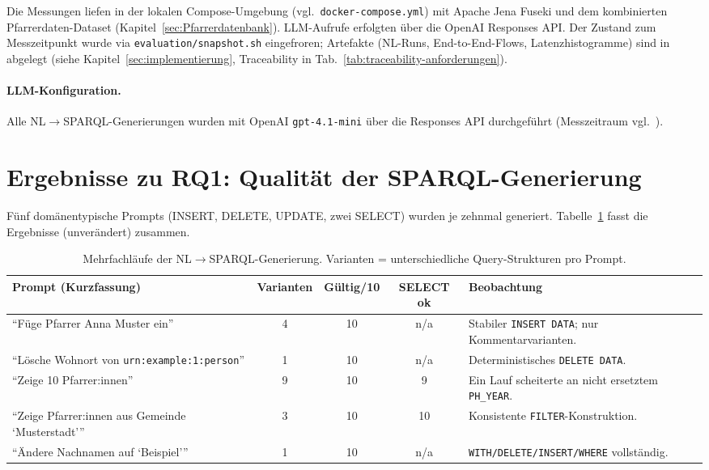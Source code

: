 Die Messungen liefen in der lokalen Compose-Umgebung (vgl.\ \texttt{docker-compose.yml}) mit Apache Jena Fuseki und dem kombinierten Pfarrerdaten-Dataset (Kapitel~\ref{sec:Pfarrerdatenbank}). LLM-Aufrufe erfolgten über die OpenAI Responses API. Der Zustand zum Messzeitpunkt wurde via \texttt{evaluation/snapshot.sh} eingefroren; Artefakte (NL-Runs, End-to-End-Flows, Latenzhistogramme) sind in  abgelegt (siehe Kapitel~\ref{sec:implementierung}, Traceability in Tab.~\ref{tab:traceability-anforderungen}). \paragraph{LLM-Konfiguration.}
Alle NL$\rightarrow$SPARQL-Generierungen wurden mit OpenAI \texttt{gpt-4.1-mini} über die Responses API durchgeführt (Messzeitraum vgl.\ ).


\section{Ergebnisse zu RQ1: Qualität der SPARQL-Generierung}
\label{sec:ergebnisse-rq1}

Fünf domänentypische Prompts (INSERT, DELETE, UPDATE, zwei SELECT) wurden je zehnmal generiert. Tabelle~\ref{tab:nl-eval} fasst die Ergebnisse (unverändert) zusammen.

\begin{table}[ht]
\centering
\begin{tabularx}{\textwidth}{>{\raggedright\arraybackslash}X c c c >{\raggedright\arraybackslash}X}
\toprule
Prompt (Kurzfassung) & Varianten & Gültig/10 & SELECT ok & Beobachtung \\
\midrule
\enquote{Füge Pfarrer Anna Muster ein} & 4 & 10 & n/a & Stabiler \texttt{INSERT DATA}; nur Kommentarvarianten.\\
\enquote{Lösche Wohnort von \texttt{urn:example:1:person}} & 1 & 10 & n/a & Deterministisches \texttt{DELETE DATA}.\\
\enquote{Zeige 10 Pfarrer:innen} & 9 & 10 & 9 & Ein Lauf scheiterte an nicht ersetztem \texttt{PH\_YEAR}.\\
\enquote{Zeige Pfarrer:innen aus Gemeinde \enquote{Musterstadt}} & 3 & 10 & 10 & Konsistente \texttt{FILTER}-Konstruktion.\\
\enquote{Ändere Nachnamen auf \enquote{Beispiel}} & 1 & 10 & n/a & \texttt{WITH/DELETE/INSERT/WHERE} vollständig.\\
\bottomrule
\end{tabularx}
\caption[NL$\rightarrow$SPARQL-Läufe]{Mehrfachläufe der NL$\rightarrow$SPARQL-Generierung. Varianten = unterschiedliche Query-Strukturen pro Prompt.}
\label{tab:nl-eval}
\end{table}

